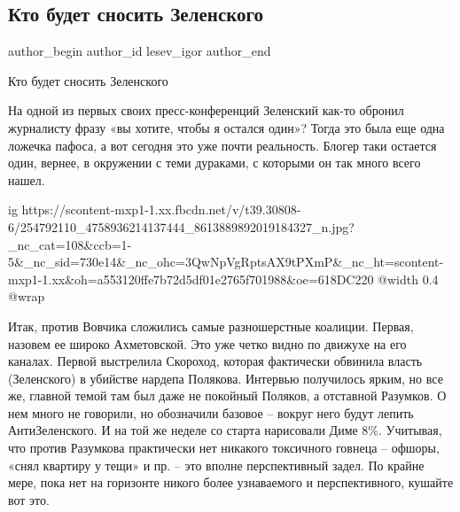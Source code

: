  
 
 
 
 
 
\subsection{Кто будет сносить Зеленского}
\label{sec:08_11_2021.fb.lesev_igor.1.kto_budet_snosit_zelenskogo}
 
\ifcmt
 author_begin
   author_id lesev_igor
 author_end
\fi

Кто будет сносить Зеленского

На одной из первых своих пресс-конференций Зеленский как-то обронил журналисту
фразу «вы хотите, чтобы я остался один»? Тогда это была еще одна ложечка
пафоса, а вот сегодня это уже почти реальность. Блогер таки остается один,
вернее, в окружении с теми дураками, с которыми он так много всего нашел.

\ifcmt
  ig https://scontent-mxp1-1.xx.fbcdn.net/v/t39.30808-6/254792110_4758936214137444_8613889892019184327_n.jpg?_nc_cat=108&ccb=1-5&_nc_sid=730e14&_nc_ohc=3QwNpVgRptsAX9tPXmP&_nc_ht=scontent-mxp1-1.xx&oh=a553120ffe7b72d5df01e2765f701988&oe=618DC220
  @width 0.4
  @wrap 
\fi

Итак, против Вовчика сложились самые разношерстные коалиции. Первая, назовем ее
широко Ахметовской. Это уже четко видно по движухе на его каналах. Первой
выстрелила Скороход, которая фактически обвинила власть (Зеленского) в убийстве
нардепа Полякова. Интервью получилось ярким, но все же, главной темой там был
даже не покойный Поляков, а отставной Разумков. О нем много не говорили, но
обозначили базовое – вокруг него будут лепить АнтиЗеленского. И на той же
неделе со старта нарисовали Диме 8\%. Учитывая, что против Разумкова практически
нет никакого токсичного говнеца – офшоры, «снял квартиру у тещи» и пр. – это
вполне перспективный задел. По крайне мере, пока нет на горизонте никого более
узнаваемого и перспективного, кушайте вот это.

